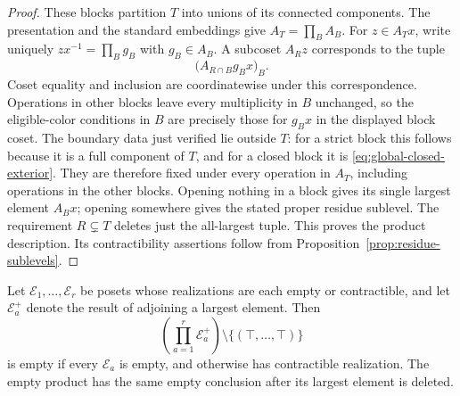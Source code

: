 \begin{proof}
These blocks partition $T$ into unions of its connected components.
The presentation and the standard embeddings give
$A_T=\prod_B A_B$.  For $z\in A_Tx$, write uniquely
$zx^{-1}=\prod_B g_B$ with $g_B\in A_B$.  A subcoset $A_Rz$ corresponds
to the tuple
\[
 \bigl(A_{R\cap B}g_Bx\bigr)_B.
\]
Coset equality and inclusion are coordinatewise under this
correspondence.  Operations in other blocks leave every multiplicity in
$B$ unchanged, so the eligible-color conditions in $B$ are precisely
those for $g_Bx$ in the displayed block coset.  The boundary data just
verified lie outside $T$: for a strict block this follows because it is
a full component of $T$, and for a closed block it is
\eqref{eq:global-closed-exterior}.  They are therefore fixed under every
operation in $A_T$, including operations in the other blocks.  Opening nothing in a block gives its
single largest element $A_Bx$; opening somewhere gives the stated
proper residue sublevel.  The requirement $R\subsetneq T$ deletes just
the all-largest tuple.  This proves the product description.  Its
contractibility assertions follow from
Proposition~\ref{prop:residue-sublevels}.
\end{proof}

\begin{lemma}\label{lem:global-product-minus-top}
Let $\mathcal E_1,\ldots,\mathcal E_r$ be posets whose realizations are
each empty or contractible, and let $\mathcal E_a^+$ denote the result
of adjoining a largest element.  Then
\[
 \left(\prod_{a=1}^r\mathcal E_a^+\right)
          \setminus\{(\top,\ldots,\top)\}
\]
is empty if every $\mathcal E_a$ is empty, and otherwise has
contractible realization.  The empty product has the same empty
conclusion after its largest element is deleted.
\end{lemma}

